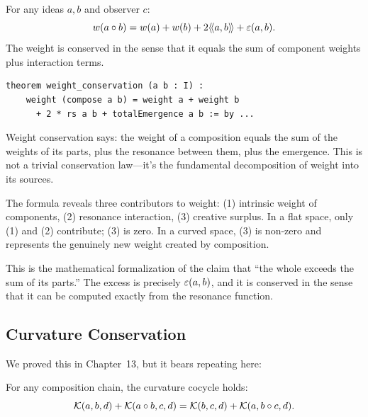 \begin{theorem}
\label{thm:weight-conservation}
For any ideas $a, b$ and observer $c$:
\[
  w(a \circ b) = w(a) + w(b)
    + 2\langle\!\langle a, b \rangle\!\rangle + \varepsilon(a, b).
\]
The weight is conserved in the sense that it equals the sum of component
weights plus interaction terms.
\end{theorem}

\begin{lstlisting}[caption={Weight conservation (IDT\_v3\_Emergence.lean)}]
theorem weight_conservation (a b : I) :
    weight (compose a b) = weight a + weight b
      + 2 * rs a b + totalEmergence a b := by ...
\end{lstlisting}

\begin{interpretation}
Weight conservation says: the weight of a composition equals the sum of the
weights of its parts, plus the resonance between them, plus the emergence.
This is not a trivial conservation law---it's the fundamental decomposition
of weight into its sources.

The formula reveals three contributors to weight: (1) intrinsic weight of
components, (2) resonance interaction, (3) creative surplus. In a flat space,
only (1) and (2) contribute; (3) is zero. In a curved space, (3) is non-zero
and represents the genuinely new weight created by composition.

This is the mathematical formalization of the claim that ``the whole exceeds
the sum of its parts.'' The excess is precisely $\varepsilon(a, b)$, and it is
conserved in the sense that it can be computed exactly from the resonance
function.
\end{interpretation}

\subsection{Curvature Conservation}

We proved this in Chapter~13, but it bears repeating here:

\begin{theorem}
\label{thm:curvature-conservation-repeat}
For any composition chain, the curvature cocycle holds:
\[
  \mathcal{K}(a, b, d) + \mathcal{K}(a \circ b, c, d)
  = \mathcal{K}(b, c, d) + \mathcal{K}(a, b \circ c, d).
\]
\end{theorem}

